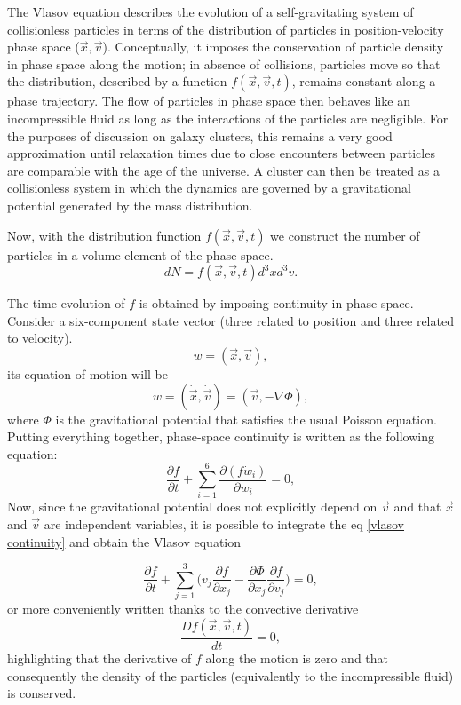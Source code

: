 The Vlasov equation describes the evolution of a self-gravitating system of collisionless particles in terms of the distribution of particles in position-velocity phase space ($\Vec{x}, \Vec{v}$). Conceptually, it imposes the conservation of particle density in phase space along the motion; in absence of collisions, particles move so that the distribution, described by a function $f(\Vec{x}, \Vec{v}, t)$, remains constant along a phase trajectory.
The flow of particles in phase space then behaves like an incompressible fluid as long as the interactions of the particles are negligible. For the purposes of discussion on galaxy clusters, this remains a very good approximation until relaxation times due to close encounters between particles are comparable with the age of the universe. A cluster can then be treated as a collisionless system in which the dynamics are governed by a gravitational potential generated by the mass distribution.

Now, with the distribution function $f(\Vec{x}, \Vec{v}, t)$ we construct the number of particles in a volume element of the phase space.
\begin{equation}
    dN = f(\Vec{x}, \Vec{v}, t) d^3x d^3v.
\end{equation}

The time evolution of $f$ is obtained by imposing continuity in phase space. Consider a six-component state vector (three related to position and three related to velocity).
\begin{equation}
    w = (\Vec{x},\Vec{v}),
\end{equation}
its equation of motion will be
\begin{equation}
    \dot{w} = (\dot{\Vec{x}}, \dot{\Vec{v}}) = (\Vec{v}, -\nabla \Phi),
\end{equation}
where $\Phi$ is the gravitational potential that satisfies the usual Poisson equation.
Putting everything together, phase-space continuity is written as the following equation:
\begin{equation} \label{vlasov continuità}
    \frac{\partial f}{\partial t} + \sum_{i=1}^{6} \frac{\partial (f \dot{w}_i)}{\partial w_i} = 0,
\end{equation}
Now, since the gravitational potential does not explicitly depend on $\vec{v}$ and that $\Vec{x}$ and $\Vec{v}$ are independent variables, it is possible to integrate the eq \eqref{vlasov continuity} and obtain the Vlasov equation

\begin{equation}\label{vlasov equation}
    \frac{\partial f}{\partial t} + \sum_{j=1}^{3} \Big( v_j\frac{\partial f}{\partial x_j} - \frac{\partial \Phi}{\partial x_j}\frac{\partial f}{\partial v_j} \Big) = 0,
\end{equation}
or more conveniently written thanks to the convective derivative
\begin{equation}
    \frac{Df(\Vec{x}, \Vec{v},t)}{dt} = 0,
\end{equation} 
highlighting that the derivative of $f$ along the motion is zero and that consequently the density of the particles (equivalently to the incompressible fluid) is conserved.

